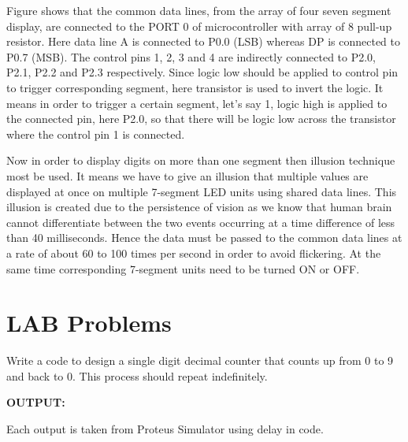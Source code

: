 \documentclass{article}
\begin{document}
Figure shows that the common data lines, from the array of four seven segment display,
are connected to the PORT 0 of microcontroller with array of 8 pull-up resistor.
Here data line A is connected to P0.0 (LSB) whereas DP is connected to P0.7 (MSB).
The control pins 1, 2, 3 and 4 are indirectly connected to P2.0, P2.1, P2.2 and P2.3 respectively.
Since logic low should be applied to control pin to trigger corresponding segment,
here transistor is used to invert the logic. It means in order to trigger a certain segment, let’s say 1,
logic high is applied to the connected pin, here P2.0,
so that there will be logic low across the transistor where the control pin 1 is connected.


Now in order to display digits on more than one segment then illusion technique most be used.
It means we have to give an illusion that multiple values are displayed at once on multiple 7-segment LED units using shared data lines.
This illusion is created due to the persistence of vision as we know that human brain cannot differentiate between the two events occurring at a time difference of less than 40 milliseconds.
Hence the data must be passed to the common data lines at a rate of about 60 to 100 times per second in order to avoid flickering.
At the same time corresponding 7-segment units need to be turned ON or OFF.

\pagebreak
\section{LAB Problems}
\begin{Q}
    {
        Write a code to design a single digit decimal counter that counts up from 0 to 9 and back to 0.
        This process should repeat indefinitely.
    }
\end{Q}

\textbf{OUTPUT:}

Each output is taken from Proteus Simulator  using delay in code.
\end{document}
